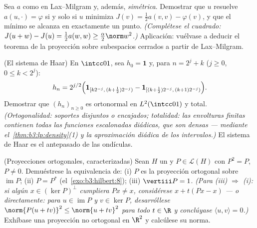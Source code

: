 \begin{exercise}[$\star\star$]\label{exo:b3:hilbert:9}
Sea $a$ como en Lax--Milgram y, además, \emph{simétrica}. Demostrar que
$u$ resuelve $a(u, \cdot) = \varphi$ si y solo si $u$ minimiza
$J(v) = \frac12a(v, v) - \varphi(v)$, y que el mínimo se alcanza en
exactamente un punto.
\emph{(Complétese el cuadrado:
$J(u + w) - J(u) = \frac12a(w,w) \geq
\frac\alpha2\norm w^2$.)} Aplicación: vuélvase a deducir el teorema de
la proyección sobre subespacios cerrados a partir de Lax--Milgram.
\end{exercise}

\begin{exercise}[$\star\star\star$]\label{exo:b3:hilbert:10}
(El sistema de Haar) En $\intcc01$, sea $h_{0} = \mathbf 1$ y, para
$n = 2^j + k$ ($j \geq 0$, $0 \leq k < 2^j$):
\[
h_n = 2^{j/2}\Bigl(\mathbf 1_{[k2^{-j},\,(k +
\frac12)2^{-j})} - \mathbf 1_{[(k+\frac12)2^{-j},\,(k+1)2^{-j})}
\Bigr).
\]
Demostrar que $(h_n)_{n\geq0}$ es ortonormal en $L^2(\intcc01)$ y total.
\emph{(Ortogonalidad: soportes disjuntos o encajados; totalidad: las
envolturas finitas contienen todas las funciones escalonadas diádicas,
que son densas --- mediante el~\cref{thm:b3:lp:density}(1) y la
aproximación diádica de los intervalos.)} El sistema de Haar es el
antepasado de las ondículas.
\end{exercise}

\begin{exercise}[$\star\star$]\label{exo:b3:hilbert:11}
(Proyecciones ortogonales, caracterizadas) Sean $H$ un
 y
$P \in \mathcal L(H)$ con $P^2 = P$, $P \neq 0$. Demuéstrese la
equivalencia de: (i) $P$ es la proyección ortogonal sobre
$\operatorname{im}P$;
(ii) $P = P^*$ (el~\cref{exo:b3:hilbert:8}); (iii) $\vertiii P = 1$.
\emph{(Para (iii) $\Rightarrow$ (i): si algún $x \in
(\ker P)^\perp$ cumpliera $Px \neq x$, considérese $x + t(Px - x)$ --- o
directamente: para $u \in \operatorname{im}P$ y $v \in
\ker P$, desarróllese $\norm{P(u + tv)}^2 \leq \norm{u + tv}^2$ para
todo $t \in \R$ y conclúyase $\langle u, v\rangle = 0$.)} Exhíbase una
proyección no ortogonal en $\R^2$ y calcúlese su norma.
\end{exercise}

